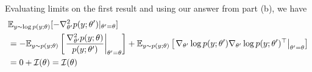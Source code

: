 \begin{answer}
Evaluating limits on the first result and using our answer from part (b), we have
\begin{align*}
&\mathbb{E}_{y\sim \log p(y;\theta)}[-\nabla_{\theta'}^2 p(y;\theta')|_{\theta'=\theta}] \\
&= - \mathbb{E}_{y \sim p(y;\theta)} \left[ \left. \dfrac{\nabla_{\theta'}^2 p(y;\theta)}{p(y;\theta')} \right|_{\theta'=\theta}\right] + \mathbb{E}_{y \sim p(y;\theta)} \left[ \left. \nabla_{\theta'} \log p(y;\theta') \nabla_{\theta'} \log p(y;\theta')^\top \right|_{\theta'=\theta}\right] \\
&= 0 + \mathcal{I}(\theta)
= \mathcal{I}(\theta)
\end{align*}
\end{answer}
